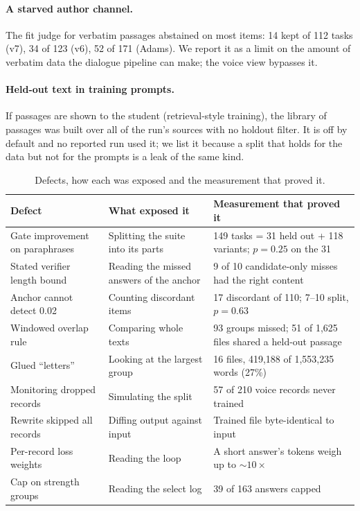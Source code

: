 \paragraph{A starved author channel.}
The fit judge for verbatim passages abstained on most items: 14 kept of 112 tasks (v7), 34
of 123 (v6), 52 of 171 (Adams). We report it as a limit on the amount of verbatim data the
dialogue pipeline can make; the voice view bypasses it.

\paragraph{Held-out text in training prompts.}
If passages are shown to the student (retrieval-style training), the library of passages was
built over all of the run's sources with no holdout filter. It is off by default and no
reported run used it; we list it because a split that holds for the data but not for the
prompts is a leak of the same kind.

\begin{table}[t]
\centering\small
\begin{tabular}{@{}p{3.6cm}p{4.6cm}p{6.2cm}@{}}
\toprule
Defect & What exposed it & Measurement that proved it \\
\midrule
Gate improvement on paraphrases & Splitting the suite into its parts & 149 tasks = 31 held out + 118 variants; $p=0.25$ on the 31 \\
Stated verifier length bound & Reading the missed answers of the anchor & 9 of 10 candidate-only misses had the right content \\
Anchor cannot detect 0.02 & Counting discordant items & 17 discordant of 110; 7--10 split, $p=0.63$ \\
Windowed overlap rule & Comparing whole texts & 93 groups missed; 51 of 1,625 files shared a held-out passage \\
Glued ``letters'' & Looking at the largest group & 16 files, 419,188 of 1,553,235 words (27\%) \\
Monitoring dropped records & Simulating the split & 57 of 210 voice records never trained \\
Rewrite skipped all records & Diffing output against input & Trained file byte-identical to input \\
Per-record loss weights & Reading the loop & A short answer's tokens weigh up to $\sim10\times$ \\
Cap on strength groups & Reading the select log & 39 of 163 answers capped \\
\bottomrule
\end{tabular}
\caption{Defects, how each was exposed and the measurement that proved it.}
\label{tab:defects}
\end{table}
